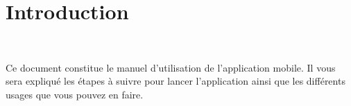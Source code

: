 \chapter*{Introduction}
\thispagestyle{plain}
~\\[1cm]
{ \large

Ce document constitue le manuel d'utilisation de l'application mobile. Il vous sera expliqué
les étapes à suivre pour lancer l'application ainsi que les différents usages que vous pouvez en faire.
}

